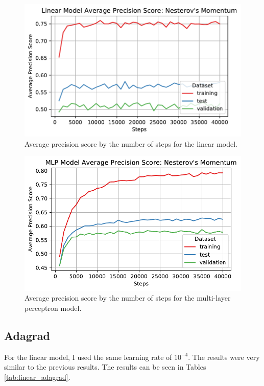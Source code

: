 \documentclass[letterpaper,11pt]{article}
\begin{document}
  \begin{figure}
    \centering
    \includegraphics{problem4/linear_average_precision_score_nesterov.pdf}
    \caption{Average precision score by the number of steps for the linear
      model.}
    \label{fig:linear_average_precision_score_nesterov}
  \end{figure}
  
  \begin{figure}
    \centering
    \includegraphics{problem4/mlp_average_precision_score_nesterov.pdf}
    \caption{Average precision score by the number of steps for the multi-layer
      perceptron model.}
    \label{fig:mlp_average_precision_score_nesterov}
  \end{figure}

  \subsection*{Adagrad}

  For the linear model, I used the same learning rate of $10^{-4}$. The results
  were very similar to the previous results. The results can be seen in Tables
  \ref{tab:linear_adagrad}.
\end{document}
